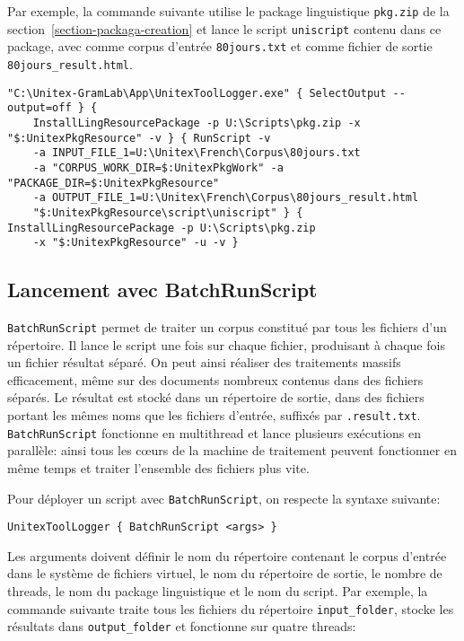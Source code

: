 \noindent Par exemple, la commande suivante utilise le package linguistique \verb$pkg.zip$ de la
section~\ref{section-packaga-creation} et lance
le script \verb$uniscript$ contenu dans ce package, avec comme corpus d'entrée \verb$80jours.txt$
et comme fichier de sortie \verb$80jours_result.html$.

\begin{Verbatim}[fontsize=\small,fontfamily=helvetica]
"C:\Unitex-GramLab\App\UnitexToolLogger.exe" { SelectOutput --output=off } {
    InstallLingResourcePackage -p U:\Scripts\pkg.zip -x "$:UnitexPkgResource" -v } { RunScript -v
    -a INPUT_FILE_1=U:\Unitex\French\Corpus\80jours.txt 
    -a "CORPUS_WORK_DIR=$:UnitexPkgWork" -a "PACKAGE_DIR=$:UnitexPkgResource"
    -a OUTPUT_FILE_1=U:\Unitex\French\Corpus\80jours_result.html 
    "$:UnitexPkgResource\script\uniscript" } { InstallLingResourcePackage -p U:\Scripts\pkg.zip 
    -x "$:UnitexPkgResource" -u -v }
\end{Verbatim}



\subsection{Lancement avec BatchRunScript}
\label{launch-script}

\verb$BatchRunScript$ permet de traiter un corpus constitué par tous les fichiers d'un répertoire.
Il lance le script une fois sur chaque fichier, produisant à chaque fois un fichier résultat séparé.
On peut ainsi réaliser des traitements massifs efficacement, même sur des documents nombreux
contenus dans des fichiers séparés. Le résultat est stocké dans un répertoire de sortie, dans des
fichiers portant les mêmes noms que les fichiers d'entrée, suffixés par \verb$.result.txt$.
\verb$BatchRunScript$ fonctionne en multithread et lance plusieurs exécutions en parallèle: ainsi
tous les cœurs de la machine de traitement peuvent fonctionner en même temps et traiter
l’ensemble des fichiers plus vite.

\bigskip
\noindent Pour déployer un script avec \verb$BatchRunScript$, on respecte la syntaxe suivante:

\begin{verbatim}
UnitexToolLogger { BatchRunScript <args> }
\end{verbatim}

\noindent Les arguments doivent définir le nom du répertoire contenant le corpus d'entrée
dans le système de fichiers virtuel, le nom du répertoire de sortie, le nombre de threads, le nom
du package linguistique et le nom du script. Par exemple, la commande suivante traite tous les
fichiers du répertoire \verb$input_folder$, stocke les résultats dans \verb$output_folder$
et fonctionne sur quatre threads:

